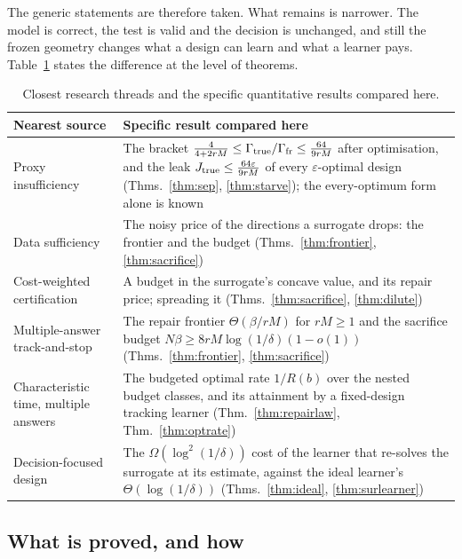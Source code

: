 The generic statements are therefore taken. What remains is narrower. The model is correct,
the test is valid and the decision is unchanged, and still the frozen geometry changes what a
design can learn and what a learner pays. Table~\ref{tab:prior} states the difference at the
level of theorems.

\begin{table}[h]
\caption{Closest research threads and the specific quantitative results compared here.}
\label{tab:prior}
\centering
\footnotesize
\begin{tabular}{@{}p{}p{}@{}}
\toprule
Nearest source & Specific result compared here \\
\midrule
Proxy insufficiency~\cite{schutte2026,overstall2022} & The bracket
$\frac{4}{4+2rM}\le\Gamma_{\rm true}/\Gamma_{\rm fr}\le\frac{64}{9rM}$ after optimisation, and
the leak $J_{\rm true}\le\frac{64\varepsilon}{9rM}$ of every $\varepsilon$-optimal design
(Thms.~\ref{thm:sep}, \ref{thm:starve}); the every-optimum form alone is known \\
Data sufficiency~\cite{bennouna2025} & The noisy price of the directions a surrogate drops: the
frontier and the budget (Thms.~\ref{thm:frontier}, \ref{thm:sacrifice}) \\
Cost-weighted certification~\cite{huang2026,yang2024} & A budget in the surrogate's concave
value, and its repair price; spreading it (Thms.~\ref{thm:sacrifice}, \ref{thm:dilute}) \\
Multiple-answer track-and-stop~\cite{degenne2019} & The repair frontier
$\Theta(\beta/rM)$ for $rM\ge1$ and the sacrifice budget $N\beta\ge8rM\log(1/\delta)(1-o(1))$
(Thms.~\ref{thm:frontier}, \ref{thm:sacrifice}) \\
Characteristic time, multiple answers~\cite{garivier2016,degenne2019} & The budgeted optimal rate
$1/R(b)$ over the nested budget classes, and its attainment by a fixed-design tracking learner
(Thm.~\ref{thm:repairlaw}, Thm.~\ref{thm:optrate}) \\
Decision-focused design~\cite{wan2026} & The $\Omega(\log^{2}(1/\delta))$ cost of the
learner that re-solves the surrogate at its estimate, against the ideal learner's
$\Theta(\log(1/\delta))$ (Thms.~\ref{thm:ideal}, \ref{thm:surlearner}) \\
\bottomrule
\end{tabular}
\end{table}

\subsection{What is proved, and how}

